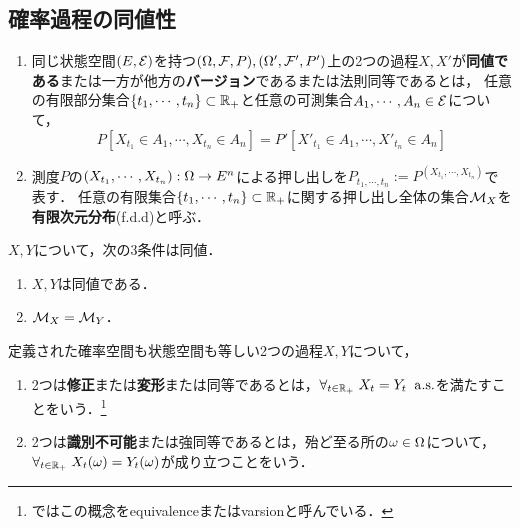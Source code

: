 \documentclass[uplatex,dvipdfmx]{jsreport}
\begin{document}
\subsection{確率過程の同値性}

\begin{definition}\mbox{}
    \begin{enumerate}
        \item 同じ状態空間$(E,\mathcal{E})$を持つ$(\Omega,\mathcal{F},P),(\Omega',\mathcal{F}',P')$上の2つの過程$X,X'$が\textbf{同値である}または一方が他方の\textbf{バージョン}であるまたは法則同等\cite{伊藤清確率論}であるとは，
        任意の有限部分集合$\{t_1,\cdots,t_n\}\subset\mathbb{R}_+$と任意の可測集合$A_1,\cdots,A_n\in\mathcal{E}$について，
        \[P[X_{t_1}\in A_1,\cdots,X_{t_n}\in A_n]=P'[X'_{t_1}\in A_1,\cdots,X'_{t_n}\in A_n]\]
        \item 測度$P$の$(X_{t_1},\cdots,X_{t_n}):\Omega\to E^n$による押し出しを$P_{t_1,\cdots,t_n}:=P^{(X_{t_1},\cdots,X_{t_n})}$で表す．
        任意の有限集合$\{t_1,\cdots,t_n\}\subset\mathbb{R}_+$に関する押し出し全体の集合$\mathcal{M}_X$を\textbf{有限次元分布}(f.d.d)と呼ぶ．
    \end{enumerate}
\end{definition}
\begin{lemma}[過程の同値性の特徴付け]
    $X,Y$について，次の3条件は同値．
    \begin{enumerate}
        \item $X,Y$は同値である．
        \item $\mathcal{M}_X=\mathcal{M}_Y$．
    \end{enumerate}
\end{lemma}

\begin{definition}
    定義された確率空間も状態空間も等しい2つの過程$X,Y$について，
    \begin{enumerate}
        \item 2つは\textbf{修正}または\textbf{変形}または同等\cite{伊藤清確率論}であるとは，$\forall_{t\in\mathbb{R}_+}\;X_t=Y_t\;\;\mathrm{a.s.}$を満たすことをいう．\footnote{\cite{Nualart}ではこの概念をequivalenceまたはvarsionと呼んでいる．}
        \item 2つは\textbf{識別不可能}または強同等\cite{伊藤清確率論}であるとは，殆ど至る所の$\omega\in\Omega$について，$\forall_{t\in\mathbb{R}_+}\;X_t(\omega)=Y_t(\omega)$が成り立つことをいう．
    \end{enumerate}
\end{definition}
\end{document}
